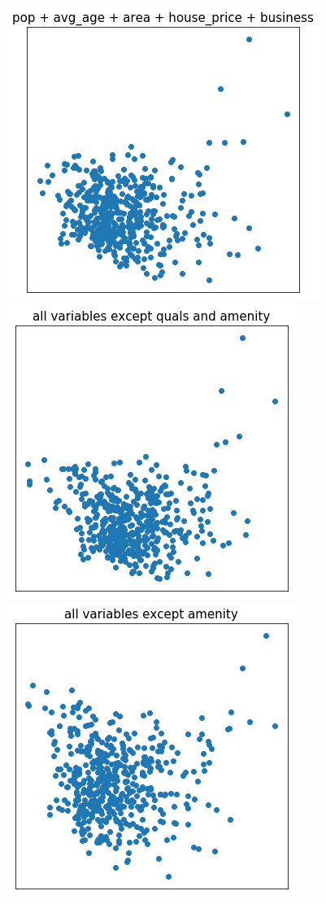 \documentclass[a4paper, 11pt]{article}
\begin{document}
\begin{figure}
\includegraphics[scale=.32]{../gfx/cluster3.png}
\includegraphics[scale=.32]{../gfx/cluster4.png}
\includegraphics[scale=.32]{../gfx/cluster5.png}\\

\end{figure}
\end{document}
